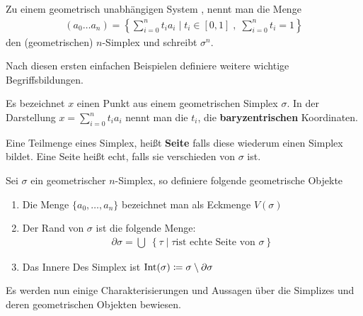 \begin{Def}
  Zu einem geometrisch unabhängigen System \gs, nennt man die Menge
  \begin{gather*}
    (a_0 \ldots a_n) = \left\{ \sum\limits_{i=0}^n t_i a_i \; \Big|
      \; %
      t_i \in [0,1] \; , \; \sum\limits_{i=0}^n t_i = 1 \right\}
  \end{gather*}
  den (geometrischen) $n$-Simplex und schreibt $\sigma^n$.
\end{Def}


Nach diesen ersten einfachen Beispielen definiere weitere wichtige
Begriffsbildungen.

\begin{Def}
  Es bezeichnet $x$ einen Punkt aus einem geometrischen Simplex
  $\sigma$. In der Darstellung $x = \sum\limits_{i=0}^n t_i a_i$ nennt
  man die $t_i$, die \textbf{baryzentrischen} Koordinaten.
	
  Eine Teilmenge eines Simplex, heißt \textbf{Seite} falls diese
  wiederum einen Simplex bildet. Eine Seite heißt echt, falls sie
  verschieden von $\sigma$ ist.
\end{Def}

\begin{Def}
  Sei $\sigma$ ein geometrischer $n$-Simplex, so definiere folgende
  geometrische Objekte
  \begin{enumerate}[{\bfseries1)}]
  \item Die Menge $\{ a_0 , \ldots , a_n \}$ bezeichnet man als
    Eckmenge $V(\sigma)$
  \item Der Rand von $\sigma$ ist die folgende Menge:
    \begin{gather*}
      \partial\sigma = \bigcup \; \left\{ \tau \; \Big| \; \tau \text{
          ist echte Seite von } \sigma \right\}
    \end{gather*}
  \item Das Innere Des Simplex ist
    $\operatorname{Int}(\sigma) \coloneqq \sigma \setminus \partial\sigma$
  \end{enumerate}
\end{Def}

Es werden nun einige Charakterisierungen und Aussagen über die
Simplizes und deren geometrischen Objekten bewiesen.

